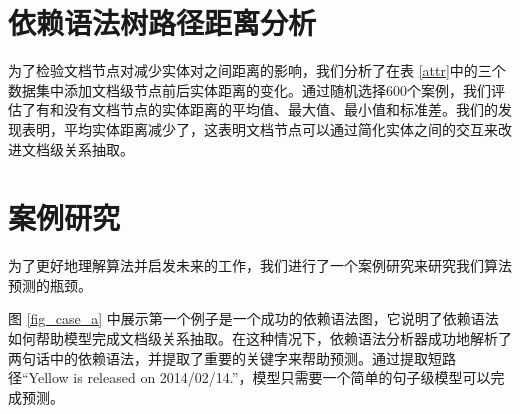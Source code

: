 \documentclass[bachelor]{thesis-uestc}
\begin{document}
\section{依赖语法树路径距离分析}\label{sec:distance}
\begin{table}
    \caption{DocRED、CDR、GDA数据集中具有文档节点和不具有文档节点的实体距离的平均/最大/最小长度和标准差}
    \label{attr}
\end{table}

为了检验文档节点对减少实体对之间距离的影响，我们分析了在表 \ref{attr}中的三个数据集中添加文档级节点前后实体距离的变化。通过随机选择600个案例，我们评估了有和没有文档节点的实体距离的平均值、最大值、最小值和标准差。我们的发现表明，平均实体距离减少了，这表明文档节点可以通过简化实体之间的交互来改进文档级关系抽取。

\section{案例研究} \label{sec:case}

为了更好地理解算法并启发未来的工作，我们进行了一个案例研究来研究我们算法预测的瓶颈。\par

图 \ref{fig_case_a} 中展示第一个例子是一个成功的依赖语法图，它说明了依赖语法如何帮助模型完成文档级关系抽取。在这种情况下，依赖语法分析器成功地解析了两句话中的依赖语法，并提取了重要的关键字来帮助预测。通过提取短路径“Yellow is released on 2014/02/14.”，模型只需要一个简单的句子级模型可以完成预测。
\end{document}

